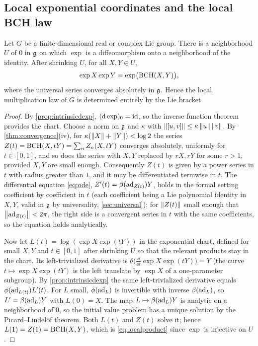 \subsection{Local exponential coordinates and the local BCH law}
\begin{theorem}\label{thm:local}
Let $G$ be a finite-dimensional real or complex Lie group. There is a
neighborhood $U$ of $0$ in $\mathfrak{g}$ on which $\exp$ is a diffeomorphism onto a
neighborhood of the identity. After shrinking $U$, for all $X,Y\in U$,
\begin{equation}\label{eq:localproduct}
 \exp X\exp Y=\exp\bigl(\operatorname{BCH}(X,Y)\bigr),
\end{equation}
where the universal series converges absolutely in $\mathfrak{g}$. Hence the local
multiplication law of $G$ is determined entirely by the Lie bracket.
\end{theorem}
\begin{proof}
By \cref{prop:intrinsicdexp}, $(\mathrm{d}\exp)_0=\operatorname{id}$, so the inverse function
theorem provides the chart. Choose a norm on $\mathfrak{g}$ and $\kappa$ with
$\left\lVert[u,v]\right\rVert\leq\kappa\left\lVert u\right\rVert\left\lVert v\right\rVert$. By \cref{thm:convergence}(iv), for
$\kappa(\left\lVert X\right\rVert+\left\lVert Y\right\rVert)<\log2$ the series $Z(t)=\operatorname{BCH}(X,tY)=\sum_nZ_n(X,tY)$
converges absolutely, uniformly for $t\in[0,1]$, and so does the series
with $X,Y$ replaced by $rX,rY$ for some $r>1$, provided $X,Y$ are small
enough. Consequently $Z(t)$ is given by a power series in $t$ with radius
greater than $1$, and it may be differentiated termwise in $t$. The
differential equation \eqref{eq:ode}, $Z'(t)=\beta(\operatorname{ad}_{Z(t)})Y$, holds in
the formal setting coefficient by coefficient in $t$ (each coefficient
being a Lie polynomial identity in $X,Y$, valid in $\mathfrak{g}$ by universality,
\cref{sec:universal}); for $\left\lVert Z(t)\right\rVert$ small enough that
$\left\lVert\operatorname{ad}_{Z(t)}\right\rVert<2\pi$, the right side is a convergent series in $t$ with
the same coefficients, so the equation holds analytically.

Now let $L(t)=\log(\exp X\exp(tY))$ in the exponential chart, defined for
small $X,Y$ and $t\in[0,1]$ after shrinking $U$ so that the relevant
products stay in the chart. Its left-trivialized derivative is
$\theta\bigl(\tfrac{\dd}{\dd t}\exp X\exp(tY)\bigr)=Y$ (the curve
$t\mapsto\exp X\exp(tY)$ is the left translate by $\exp X$ of a
one-parameter subgroup). By \cref{prop:intrinsicdexp} the same
left-trivialized derivative equals $\phi(\operatorname{ad}_{L(t)})L'(t)$. For $L$ small,
$\phi(\operatorname{ad}_L)$ is invertible with inverse $\beta(\operatorname{ad}_L)$, so
$L'=\beta(\operatorname{ad}_L)Y$ with $L(0)=X$. The map $L\mapsto\beta(\operatorname{ad}_L)Y$ is
analytic on a neighborhood of $0$, so the initial value problem has a
unique solution by the Picard--Lindel\"of theorem. Both $L(t)$ and $Z(t)$
solve it; hence $L(1)=Z(1)=\operatorname{BCH}(X,Y)$, which is \eqref{eq:localproduct}
since $\exp$ is injective on $U$.
\end{proof}
